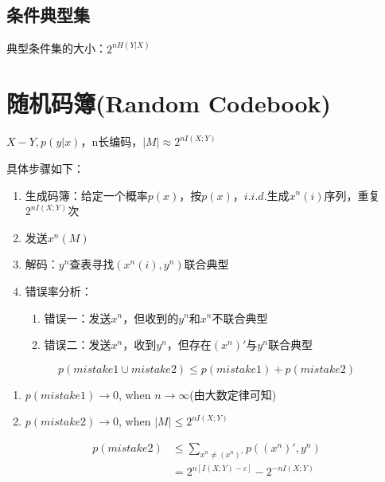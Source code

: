 \documentclass[a4paper, 12pt]{article}
\begin{document}
    \subsection{条件典型集}
    典型条件集的大小：$2^{nH(Y|X)}$    
    \section{随机码簿(Random Codebook)}
    $X-Y,p(y|x)$，n长编码，$|M|\approx 2^{nI(X;Y)}$

    具体步骤如下：
    \begin{enumerate}
        \item 生成码簿：给定一个概率$p(x)$，按$p(x)，i.i.d.$生成$x^n(i)$序列，重复$2^{nI(X;Y)}$次
        \item 发送$x^n(M)$
        \item 解码：$y^n$查表寻找$(x^n(i),y^n)$联合典型
        \item 错误率分析：
        \begin{enumerate}
            \item 错误一：发送$x^n$，但收到的$y^n$和$x^n$不联合典型
            \item 错误二：发送$x^n$，收到$y^n$，但存在$(x^n)'$与$y^n$联合典型
        \end{enumerate} 
    \end{enumerate}
    \[p(mistake1 \cup mistake2) \le p(mistake1) + p(mistake2)\]
    \begin{enumerate}
        \item $p(mistake1)\rightarrow 0$, when $n \rightarrow \infty$(由大数定律可知)
        \item $p(mistake2)\rightarrow 0$, when $|M|\le 2^{nI(X;Y)}$
    \end{enumerate}
    \begin{equation}
        \begin{aligned}
            p(mistake2) &\le \sum_{x^n\neq (x^n)'}p((x^n)', y^n)\\
            &=2^{n[I(X;Y)-\varepsilon]}-2^{-nI(X;Y)}
        \end{aligned}
    \end{equation}
\end{document}
